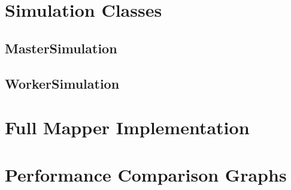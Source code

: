 \documentclass[12pt]{report}
\begin{document}
\begin{appendices}

\chapter{Simulation Classes}
\section{MasterSimulation}
\section{WorkerSimulation}

\chapter{Full Mapper Implementation}

\chapter{Performance Comparison Graphs}


\end{appendices}
\end{document}
